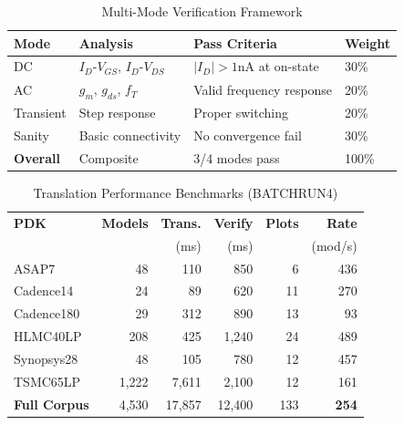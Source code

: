 \documentclass[conference]{IEEEtran}
\begin{document}
\begin{table}[!t]
\caption{Multi-Mode Verification Framework}
\label{tab:verify_modes}
\centering
\renewcommand{\arraystretch}{1.2}
\begin{tabular}{@{}llll@{}}
\toprule
\textbf{Mode} & \textbf{Analysis} & \textbf{Pass Criteria} & \textbf{Weight} \\
\midrule
DC & $I_D$-$V_{GS}$, $I_D$-$V_{DS}$ & $|I_D| > 1$nA at on-state & 30\% \\
AC & $g_m$, $g_{ds}$, $f_T$ & Valid frequency response & 20\% \\
Transient & Step response & Proper switching & 20\% \\
Sanity & Basic connectivity & No convergence fail & 30\% \\
\midrule
\textbf{Overall} & Composite & 3/4 modes pass & 100\% \\
\bottomrule
\end{tabular}
\end{table}

\begin{table}[!t]
\caption{Translation Performance Benchmarks (BATCHRUN4)}
\label{tab:performance_v4}
\centering
\renewcommand{\arraystretch}{1.2}
\begin{tabular}{@{}lrrrrr@{}}
\toprule
\textbf{PDK} & \textbf{Models} & \textbf{Trans.} & \textbf{Verify} & \textbf{Plots} & \textbf{Rate} \\
 & & (ms) & (ms) & & (mod/s) \\
\midrule
ASAP7 & 48 & 110 & 850 & 6 & 436 \\
Cadence14 & 24 & 89 & 620 & 11 & 270 \\
Cadence180 & 29 & 312 & 890 & 13 & 93 \\
HLMC40LP & 208 & 425 & 1,240 & 24 & 489 \\
Synopsys28 & 48 & 105 & 780 & 12 & 457 \\
TSMC65LP & 1,222 & 7,611 & 2,100 & 12 & 161 \\
\midrule
\textbf{Full Corpus} & 4,530 & 17,857 & 12,400 & 133 & \textbf{254} \\
\bottomrule
\end{tabular}
\end{table}
\end{document}
